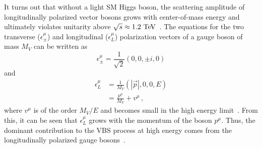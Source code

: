 It turns out that without a light SM Higgs boson, the scattering amplitude of longitudinally polarized vector bosons grows with center-of-mass energy and ultimately violates unitarity above $\sqrt{s}\approx 1.2\tev$~\cite{1977.ben-lee-weak-interactions, 2009.strong-gauge-boson-scattering}.
The equations for the two transverse ($\epsilon^{\mu}_\pm$) and longitudinal ($\epsilon^{\mu}_L$) polarization vectors of a gauge boson of mass $M_V$ can be written as
\begin{equation}
  \epsilon^{\mu}_{\pm} = \frac{1}{\sqrt{2}}(0,0,\pm i, 0)
\end{equation}
and
\begin{equation}
  \begin{aligned}
    \epsilon^{\mu}_L &= \frac{1}{M_V}(|\vec{p}|, 0, 0, E)\\
                    &= \frac{p^{\mu}}{M_V}+v^{\mu}\,,
  \end{aligned}
  \label{eq:longitudinal_polarization}
\end{equation}
where $v^{\mu}$ is of the order $M_V/E$ and becomes small in the high energy limit~\cite{1990.strong-ww-scattering}.
From this, it can be seen that $\epsilon^{\mu}_{L}$ grows with the momentum of the boson $p^{\mu}$.
Thus, the dominant contribution to the VBS process at high energy comes from the longitudinally polarized gauge bosons~\cite{2012.vbs-thesis-oord}.


